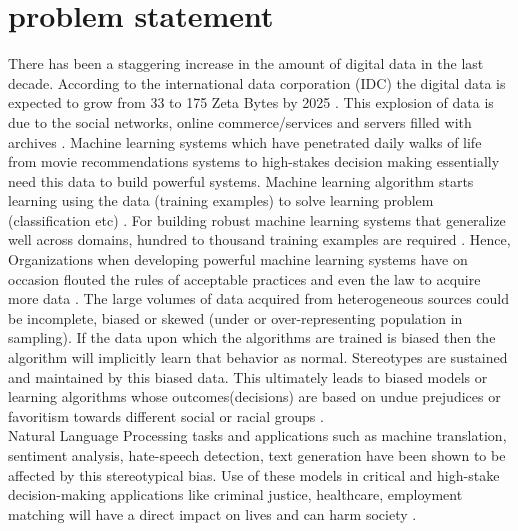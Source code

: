 \section{problem statement}
There has been a staggering increase in the amount of digital data in the last decade. According to the international data corporation (IDC) the digital data is expected to grow from 33 to 175 Zeta Bytes by 2025 \cite{IDC}. This explosion of data is due to the social networks, online commerce/services and servers filled with archives \cite{IDC}. Machine learning systems which have penetrated daily walks of life from movie recommendations systems to high-stakes decision making essentially need this data to build powerful systems. Machine learning algorithm starts learning using the data (training examples) to solve learning problem (classification etc) \cite{jordan2015machine}. For building robust machine learning systems that generalize well across domains, hundred to thousand training examples are required \cite{radford2019language}. Hence, Organizations when developing powerful machine learning systems have on occasion flouted the rules of acceptable practices and even the law to acquire more data \cite{lloyd2018bias}. The large volumes of data acquired from heterogeneous sources could be incomplete, biased or skewed (under or over-representing population in sampling)\cite{campolo2017ai}. If the data upon which the algorithms are trained is biased then the algorithm will implicitly learn that behavior as normal\cite{lloyd2018bias}. Stereotypes are sustained and maintained by this biased data. This ultimately leads to biased models or learning algorithms whose outcomes(decisions) are based on undue prejudices or favoritism towards different social or racial groups \cite{mehrabi2019survey}. 
\\
Natural Language Processing tasks and applications such as machine translation, sentiment analysis, hate-speech detection, text generation \cite{blodgett2020language} have been shown to be affected by this stereotypical bias. Use of these models in critical and high-stake decision-making applications like criminal justice, healthcare, employment matching will have a direct impact on lives and can harm society \cite{mehrabi2019survey}.
\\
